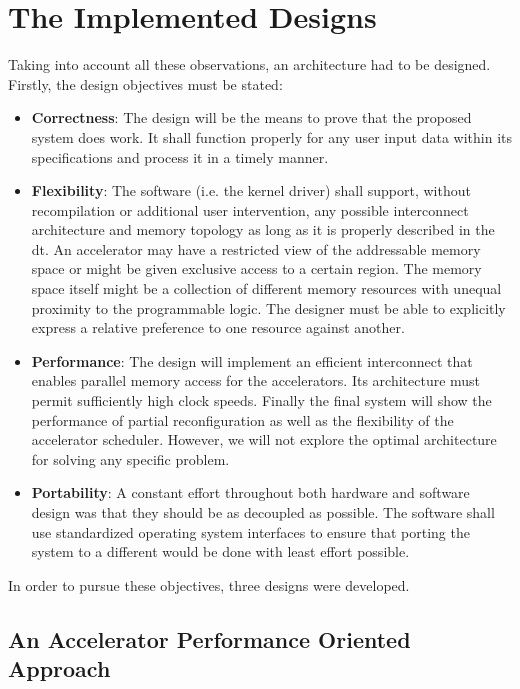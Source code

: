 \section{The Implemented Designs}

Taking into account all these observations, an architecture had to be designed.
Firstly, the design objectives must be stated:

\begin{itemize}
\item	\textbf{Correctness}:
	The design will be the means to prove that the proposed system does work.
	It shall function properly for any user input data within its specifications
	and process it in a timely manner.
\item	\textbf{Flexibility}: 
	The software (i.e. the kernel driver) shall support,
	without recompilation or additional user intervention,
	any possible interconnect architecture and memory topology
	as long as it is properly described in the \gls{dt}.
	An accelerator may have a restricted view of the addressable memory space
	or might be given exclusive access to a certain region.
	The memory space itself might be a collection of different memory resources
	with unequal proximity to the programmable logic. 
	The designer must be able to explicitly express a relative preference 
	to one resource against another.
\item	\textbf{Performance}:
	The design will implement an efficient interconnect that enables 
	parallel memory access for the accelerators. 
	Its architecture must permit sufficiently high clock speeds.
	Finally the final system will show the performance of partial reconfiguration
	as well as the flexibility of the accelerator scheduler.
	However, we will not explore the optimal architecture for solving any specific problem.
\item	\textbf{Portability}:
	A constant effort throughout both hardware and software design was that they should be
	as decoupled as possible. The software shall use standardized operating system
	interfaces to ensure that porting the system to a different would be done with
	least effort possible.
\end{itemize}

In order to pursue these objectives, three designs were developed.

\subsection{An Accelerator Performance Oriented Approach}

